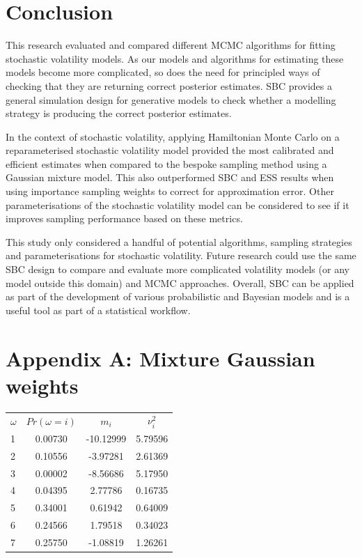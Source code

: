 \documentclass[12pt, a4paper]{article}
\begin{document}
\section{Conclusion}
This research evaluated and compared different MCMC algorithms for fitting stochastic volatility models. As our models and algorithms for estimating these models become more complicated, so does the need for principled ways of checking that they are returning correct posterior estimates. SBC provides a general simulation design for generative models to check whether a modelling strategy is producing the correct posterior estimates. 

In the context of stochastic volatility, applying Hamiltonian Monte Carlo on a reparameterised stochastic volatility model provided the most calibrated and efficient estimates when compared to the bespoke sampling method using a Gaussian mixture model. This also outperformed SBC and ESS results when using importance sampling weights to correct for approximation error. Other parameterisations of the stochastic volatility model can be considered to see if it improves sampling performance based on these metrics. 

This study only considered a handful of potential algorithms, sampling strategies and parameterisations for stochastic volatility. Future research could use the same SBC design to compare and evaluate more complicated volatility models (or any model outside this domain) and MCMC approaches. Overall, SBC can be applied as part of the development of various probabilistic and Bayesian models and is a useful tool as part of a statistical workflow.
 
\newpage



\newpage

\section{Appendix A: Mixture Gaussian weights}

\begin{table}[H]
    \centering
    \begin{tabular}{lccc} 
          $\omega$ &$Pr(\omega = i)$&  $m_i$&  $\nu^2_i$\\ 
          1&0.00730  &  -10.12999&  5.79596\\ 
          2&0.10556  &   -3.97281 &  2.61369\\ 
          3&0.00002 &  -8.56686 &   5.17950\\ 
          4&0.04395 &  2.77786  &   0.16735 \\ 
          5&0.34001&   0.61942    &  0.64009\\ 
          6&0.24566 &  1.79518    &  0.34023 \\ 
          7&0.25750 &  -1.08819    &  1.26261\\ 
    \end{tabular} 
\end{table}
\end{document}
